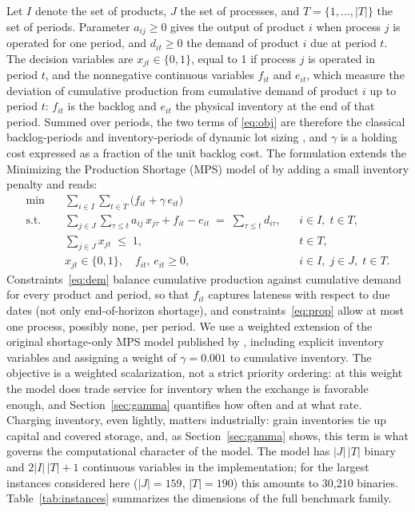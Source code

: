 Let $I$ denote the set of products, $J$ the set of processes, and
$T=\{1,\dots,|T|\}$ the set of periods. Parameter $a_{ij}\ge 0$ gives
the output of product $i$ when process $j$ is operated for one
period, and $d_{it}\ge 0$ the demand of product $i$ due at period
$t$. The decision variables are $x_{jt}\in\{0,1\}$, equal to 1 if
process $j$ is operated in period $t$, and the nonnegative continuous
variables $f_{it}$ and $e_{it}$, which measure the deviation of
cumulative production from cumulative demand of product $i$ up to
period $t$: $f_{it}$ is the backlog and $e_{it}$ the physical
inventory at the end of that period. Summed over periods, the two
terms of \eqref{eq:obj} are therefore the classical backlog-periods
and inventory-periods of dynamic lot sizing
\citep{pochet2006production}, and $\gamma$ is a holding cost expressed
as a fraction of the unit backlog cost. The formulation extends the
Minimizing the Production Shortage (MPS) model of
\citet{luche2009combining} by adding a small inventory penalty and reads:
%
\begin{align}
\min \quad & \sum_{i\in I}\sum_{t\in T}\bigl(f_{it} + \gamma\, e_{it}\bigr)
  \label{eq:obj}\\
\text{s.t.} \quad
& \sum_{j\in J}\sum_{\tau\le t} a_{ij}\, x_{j\tau} + f_{it} - e_{it}
  \;=\; \sum_{\tau\le t} d_{i\tau},
  && i\in I,\; t\in T, \label{eq:dem}\\
& \sum_{j\in J} x_{jt} \;\le\; 1, && t\in T, \label{eq:prop}\\
& x_{jt}\in\{0,1\},\quad f_{it},\,e_{it}\ge 0, && i\in I,\; j\in J,\;
  t\in T. \label{eq:dom}
\end{align}
%
Constraints~\eqref{eq:dem} balance cumulative production against
cumulative demand for every product and period, so that $f_{it}$
captures lateness with respect to due dates (not only end-of-horizon
shortage), and constraints~\eqref{eq:prop} allow at most one process, possibly none, per period. We use a weighted extension of the
original shortage-only MPS model published by \citet{luche2009combining},
including explicit inventory variables and assigning a weight of
$\gamma=0.001$ to cumulative inventory. The objective is
a weighted scalarization, not a strict priority ordering: at this
weight the model does trade service for inventory when the exchange
is favorable enough, and Section~\ref{sec:gamma} quantifies how often
and at what rate. Charging inventory, even
lightly, matters industrially: grain inventories tie up capital and
covered storage, and, as Section~\ref{sec:gamma} shows, this term is
what governs the computational character of the model. The
model has $|J|\,|T|$ binary and $2|I|\,|T|+1$ continuous variables in the implementation; for
the largest instances considered here ($|J|=159$, $|T|=190$) this
amounts to 30{,}210 binaries. Table~\ref{tab:instances} summarizes
the dimensions of the full benchmark family.

